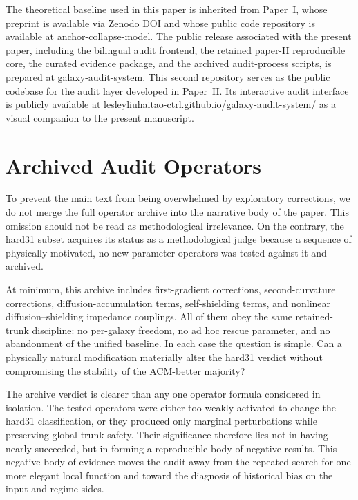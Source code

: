﻿\documentclass[aps,prd,twocolumn,superscriptaddress,longbibliography,nofootinbib,floatfix,10pt]{revtex4-2}
\begin{document}
The theoretical baseline used in this paper is inherited from Paper~I, whose
preprint is available via \href{https://doi.org/10.5281/zenodo.19163963}{Zenodo DOI}
and whose public code repository is available at
\href{https://github.com/lesleyliuhaitao-ctrl/anchor-collapse-model.git}{anchor-collapse-model}. The
public release associated with the present paper, including the bilingual audit
frontend, the retained paper-II reproducible core, the curated evidence
package, and the archived audit-process scripts, is prepared at
\href{https://github.com/lesleyliuhaitao-ctrl/galaxy-audit-system.git}{galaxy-audit-system}. This
second repository serves as the public codebase for the audit layer developed
in Paper~II. Its interactive audit interface is publicly available at
\href{https://lesleyliuhaitao-ctrl.github.io/galaxy-audit-system/}{lesleyliuhaitao-ctrl.github.io/galaxy-audit-system/}
as a visual companion to the present manuscript.

\appendix

\section{Archived Audit Operators}

To prevent the main text from being overwhelmed by exploratory corrections,
we do not merge the full operator archive into the narrative body of the
paper. This omission should not be read as methodological irrelevance. On the
contrary, the hard31 subset acquires its status as a methodological judge
because a sequence of physically motivated, no-new-parameter operators was
tested against it and archived.

At minimum, this archive includes first-gradient corrections,
second-curvature corrections, diffusion-accumulation terms,
self-shielding terms, and nonlinear diffusion--shielding impedance
couplings. All of them obey the same retained-trunk discipline: no
per-galaxy freedom, no ad hoc rescue parameter, and no abandonment of the
unified baseline. In each case the question is simple. Can a physically
natural modification materially alter the hard31 verdict without compromising
the stability of the ACM-better majority?

The archive verdict is clearer than any one operator formula considered in
isolation. The tested operators were either too weakly activated to change
the hard31 classification, or they produced only marginal perturbations while
preserving global trunk safety. Their significance therefore lies not in
having nearly succeeded, but in forming a reproducible body of negative
results. This negative body of evidence moves the audit away from the repeated
search for one more elegant local function and toward the diagnosis of
historical bias on the input and regime sides.
\end{document}
